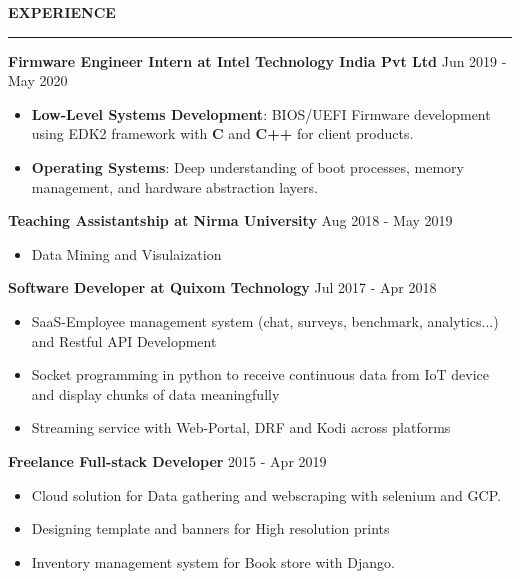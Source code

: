 \documentclass{resume} %
\renewenvironment{rSection}[1]{ %
  \sectionskip
  \textcolor{primaryColor}{\MakeUppercase{\bf #1}} %
  \sectionlineskip
  {\color{primaryColor}\hrule} %
  \begin{list}{}{ %
    \setlength{\leftmargin}{1.5em} %
  }
  \item[]
}{
  \end{list}
}
\begin{document}
\begin{rSection}{Experience}
{\textbf{\textcolor{accentColor}{Firmware Engineer Intern at Intel Technology India Pvt Ltd}}}  \hfill {Jun 2019 - May 2020}
\begin{itemize}
    \item \textbf{Low-Level Systems Development}: BIOS/UEFI Firmware development using EDK2 framework with \textbf{C} and \textbf{C++} for client products.
    \item \textbf{Operating Systems}: Deep understanding of boot processes, memory management, and hardware abstraction layers.
\end{itemize}

{\textbf{\textcolor{accentColor}{Teaching Assistantship at Nirma University}}}  \hfill {Aug 2018 - May 2019}
\begin{itemize}
    \item Data Mining and Visulaization
\end{itemize}

{\textbf{\textcolor{accentColor}{Software Developer at Quixom Technology}}}   \hfill {Jul 2017 - Apr 2018}
\begin{itemize}
    \item SaaS-Employee management system (chat, surveys, benchmark, analytics...) and Restful API Development
    \item Socket programming in python to receive continuous data from IoT device and display chunks of data meaningfully
    \item Streaming service with Web-Portal, DRF and Kodi across platforms
\end{itemize}

{\textbf{\textcolor{accentColor}{Freelance Full-stack Developer}}}   \hfill {2015 - Apr 2019}
\begin{itemize}
    \item Cloud solution for Data gathering and webscraping with selenium and GCP.
    \item Designing template and banners for High resolution prints
    \item Inventory management system for Book store with Django.
\end{itemize}

\end{rSection}
\end{document}
